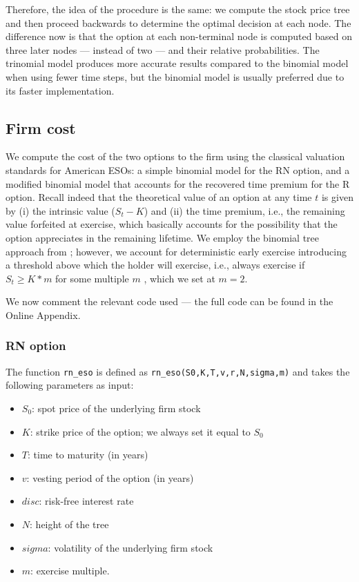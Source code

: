 Therefore, the idea of the procedure is the same: we compute the stock price tree and then proceed backwards to determine the optimal decision at each node. The difference now is that the option at each non-terminal node is computed based on three later nodes --- instead of two --- and their relative probabilities.
The trinomial model produces more accurate results compared to the binomial model when using fewer time steps, but the binomial model is usually preferred due to its faster implementation.

\subsection{Firm cost} 

We compute the cost of the two options to the firm using the classical valuation standards for American ESOs: a simple binomial model for the RN option, and a modified binomial model that accounts for the recovered time premium for the R option.
Recall indeed that the theoretical value of an option at any time $t$ is given by (i) the intrinsic value ($S_t - K$) and (ii) the time premium, i.e., the remaining value forfeited at exercise, which basically accounts for the possibility that the option appreciates in the remaining lifetime.
We employ the binomial tree approach from \citet{cox1979option}; however, we account for deterministic early exercise introducing a threshold above which the holder will exercise, i.e., always exercise if $S_t \ge K*m$ for some multiple $m$ \citep{hull2004value}, which we set at $m = 2$.

We now comment the relevant code used --- the full code can be found in the Online Appendix.

\subsubsection{RN option}
The function \verb|rn_eso| is defined as \verb|rn_eso(S0,K,T,v,r,N,sigma,m)| and takes the following parameters as input:
\begin{itemize}
    \item $S_0$: spot price of the underlying firm stock
    \item $K$: strike price of the option; we always set it equal to $S_0$ %
    \item $T$: time to maturity (in years)
    \item $v$: vesting period of the option (in years)
    \item $disc$: risk-free interest rate
    \item $N$: height of the tree
    \item $sigma$: volatility of the underlying firm stock
    \item $m$: exercise multiple.
\end{itemize}

